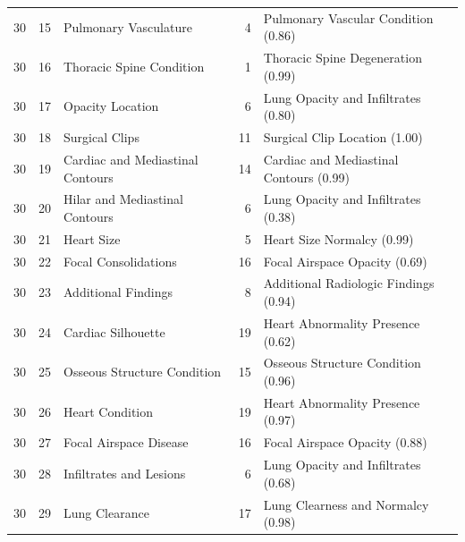 \begin{table}[t]
\begin{tabular}{rrlrl}
30 & 15 & Pulmonary Vasculature & 4 & Pulmonary Vascular Condition (0.86) \\
30 & 16 & Thoracic Spine Condition & 1 & Thoracic Spine Degeneration (0.99) \\
30 & 17 & Opacity Location & 6 & Lung Opacity and Infiltrates (0.80) \\
30 & 18 & Surgical Clips & 11 & Surgical Clip Location (1.00) \\
30 & 19 & Cardiac and Mediastinal Contours & 14 & Cardiac and Mediastinal Contours (0.99) \\
30 & 20 & Hilar and Mediastinal Contours & 6 & Lung Opacity and Infiltrates (0.38) \\
30 & 21 & Heart Size & 5 & Heart Size Normalcy (0.99) \\
30 & 22 & Focal Consolidations & 16 & Focal Airspace Opacity (0.69) \\
30 & 23 & Additional Findings & 8 & Additional Radiologic Findings (0.94) \\
30 & 24 & Cardiac Silhouette & 19 & Heart Abnormality Presence (0.62) \\
30 & 25 & Osseous Structure Condition & 15 & Osseous Structure Condition (0.96) \\
30 & 26 & Heart Condition & 19 & Heart Abnormality Presence (0.97) \\
30 & 27 & Focal Airspace Disease & 16 & Focal Airspace Opacity (0.88) \\
30 & 28 & Infiltrates and Lesions & 6 & Lung Opacity and Infiltrates (0.68) \\
30 & 29 & Lung Clearance & 17 & Lung Clearness and Normalcy (0.98) \\
\bottomrule
\end{tabular}
\end{table}